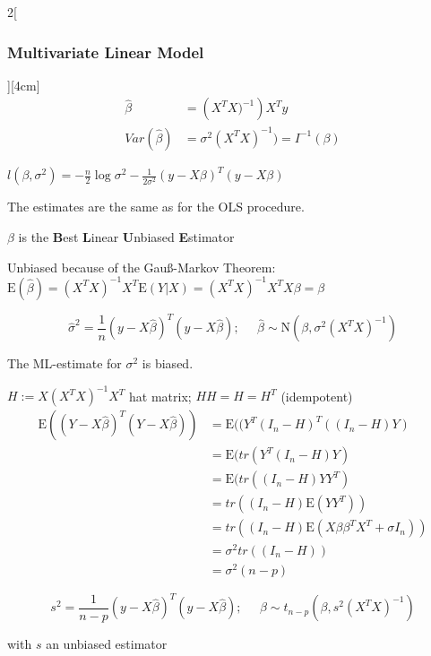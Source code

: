 \documentclass[8pt]{extarticle}
\begin{document}
\begin{multicols}{2}[\subsubsection{Multivariate Linear Model}][4cm]
\begin{align*}
\hat{\beta} &= \left(X^TX)^{-1}\right)X^Ty\\
Var(\hat{\beta}) &= \sigma^2(X^TX)^{-1}) = I^{-1}(\beta)
\end{align*}

\begin{Proof}
$l(\beta,\sigma^2) = -\frac{n}{2}\log\sigma^2 -\frac{1}{2\sigma^2}(y-X\beta)^T(y-X\beta)$
\end{Proof}
The estimates are the same as for the OLS procedure.

\noindent $\beta$ is the \textbf{B}est \textbf{L}inear \textbf{U}nbiased \textbf{E}stimator

\begin{Proof}
Unbiased because of the Gauß-Markov Theorem:
$\mathrm{E}(\hat{\beta}) = (X^TX)^{-1}X^T\mathrm{E}(Y|X) = (X^TX)^{-1}X^TX\beta = \beta$
\end{Proof}
$$\hat{\sigma}^2 = \frac{1}{n}(y-X\hat{\beta})^T(y-X\hat{\beta});\;\;\;\;\; \hat{\beta} \sim \mathrm{N}(\beta,\sigma^2(X^TX)^{-1})$$

The ML-estimate for $\sigma^2$ is biased.

\begin{Proof}
$H{:=}X(X^TX)^{-1}X^T$ hat matrix; $HH{=}H{=}H^T$ (idempotent)
\begin{align*}
\mathrm{E}((Y{-}X\hat{\beta})^T(Y{-}X\hat{\beta})) &= \mathrm{E}((Y^T(I_n{-}H)^T((I_n{-}H)Y)\\
&= \mathrm{E}(tr(Y^T(I_n{-}H)Y)\\
&= \mathrm{E}(tr((I_n{-}H)YY^T)\\
&= tr((I_n{-}H)\mathrm{E}(YY^T))\\
&= tr((I_n{-}H)\mathrm{E}(X\beta\beta^TX^T + \sigma I_n))\\
&= \sigma^2tr((I_n{-}H))\\
&= \sigma^2 (n-p)
\end{align*}
\end{Proof}

$$s^2 = \frac{1}{n-p}(y-X\hat{\beta})^T(y-X\hat{\beta});\;\;\;\;\; \hat{\beta} \sim t_{n-p}(\beta,s^2(X^TX)^{-1})$$

with $s$ an unbiased estimator

\end{multicols}

\end{document}
